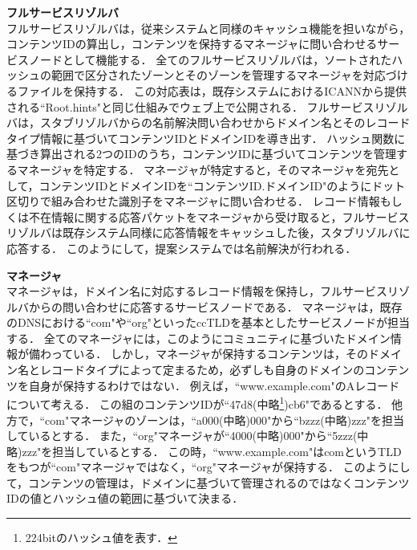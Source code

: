 \hspace{-12pt}\textbf{フルサービスリゾルバ}\\
\hspace{12pt}フルサービスリゾルバは，従来システムと同様のキャッシュ機能を担いながら，コンテンツIDの算出し，コンテンツを保持するマネージャに問い合わせるサービスノードとして機能する．
全てのフルサービスリゾルバは，ソートされたハッシュの範囲で区分されたゾーンとそのゾーンを管理するマネージャを対応づけるファイルを保持する．
この対応表は，既存システムにおけるICANNから提供される``Root.hints"と同じ仕組みでウェブ上で公開される．
フルサービスリゾルバは，スタブリゾルバからの名前解決問い合わせからドメイン名とそのレコードタイプ情報に基づいてコンテンツIDとドメインIDを導き出す．
ハッシュ関数に基づき算出される2つのIDのうち，コンテンツIDに基づいてコンテンツを管理するマネージャを特定する．
マネージャが特定すると，そのマネージャを宛先として，コンテンツIDとドメインIDを``コンテンツID.ドメインID"のようにドット区切りで組み合わせた識別子をマネージャに問い合わせる．
レコード情報もしくは不在情報に関する応答パケットをマネージャから受け取ると，フルサービスリゾルバは既存システム同様に応答情報をキャッシュした後，スタブリゾルバに応答する．
このようにして，提案システムでは名前解決が行われる．


\newpage
\hspace{-12pt}\textbf{マネージャ}\\
\hspace{12pt} マネージャは，ドメイン名に対応するレコード情報を保持し，フルサービスリゾルバからの問い合わせに応答するサービスノードである．
マネージャは，既存のDNSにおける``com"や``org"といったccTLDを基本としたサービスノードが担当する．
全てのマネージャには，このようにコミュニティに基づいたドメイン情報が備わっている．
しかし，マネージャが保持するコンテンツは，そのドメイン名とレコードタイプによって定まるため，必ずしも自身のドメインのコンテンツを自身が保持するわけではない．
例えば，``www.example.com"のAレコードについて考える．
この組のコンテンツIDが``47d8(中略\footnote{224bitのハッシュ値を表す．})cb6"であるとする．
他方で，``com"マネージャのゾーンは，``a000(中略)000"から``bzzz(中略)zzz"を担当しているとする．
また，``org"マネージャが``4000(中略)000"から``5zzz(中略)zzz"を担当しているとする．
この時，``www.example.com"はcomというTLDをもつが``com"マネージャではなく，``org"マネージャが保持する．
このようにして，コンテンツの管理は，ドメインに基づいて管理されるのではなくコンテンツIDの値とハッシュ値の範囲に基づいて決まる．


